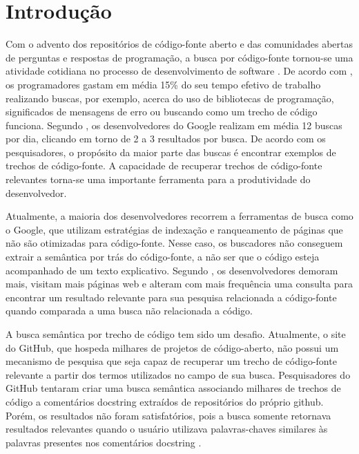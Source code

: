 \chapter{Introdução}
\label{cap:introducao}


Com o advento dos repositórios de código-fonte aberto e das comunidades abertas de perguntas e respostas de programação, a busca por código-fonte tornou-se uma atividade cotidiana no processo de desenvolvimento de software \citep{towards-summarizing-source-code-search:marin:2020}. De acordo com \cite{what-developers-search-for-on-the-web:xia:2017}, os programadores gastam em média 15\% do seu tempo efetivo de trabalho realizando buscas, por exemplo, acerca do uso de bibliotecas de programação, significados de mensagens de erro ou buscando como um trecho de código funciona. Segundo \cite{sadowski-how-developers-search-for-code-case-study:2015}, os desenvolvedores do Google realizam em média 12 buscas por dia, clicando em torno de 2 a 3 resultados por busca. De acordo com os pesquisadores, o propósito da maior parte das buscas é encontrar exemplos de trechos de código-fonte. A capacidade de recuperar trechos de código-fonte relevantes torna-se uma importante ferramenta para a produtividade do desenvolvedor. 

Atualmente, a maioria dos desenvolvedores recorrem a ferramentas de busca como o Google, que utilizam estratégias de indexação e ranqueamento de páginas que não são otimizadas para código-fonte. Nesse caso, os buscadores não conseguem extrair a semântica por trás do código-fonte, a não ser que o código esteja acompanhado de um texto explicativo. Segundo \cite{masudur-developers-use-google-code-retrieval:2018}, os desenvolvedores demoram mais, visitam mais páginas web e alteram com mais frequência uma consulta para encontrar um resultado relevante para sua pesquisa relacionada a código-fonte quando comparada a uma busca não relacionada a código.

A busca semântica por trecho de código tem sido um desafio. Atualmente, o site do GitHub, que hospeda milhares de projetos de código-aberto, não possui um mecanismo de pesquisa que
seja capaz de recuperar um trecho de código-fonte relevante a partir dos termos utilizados no campo de sua busca. Pesquisadores do GitHub tentaram criar uma busca semântica associando milhares de trechos de código a comentários \gls{docstring} extraídos de repositórios do próprio \Gls{github}. Porém, os resultados não foram satisfatórios, pois a busca somente retornava resultados relevantes quando o usuário utilizava palavras-chaves similares às palavras presentes nos comentários \gls{docstring} \citep{husain-github-semantic-search-code-2019}. 

